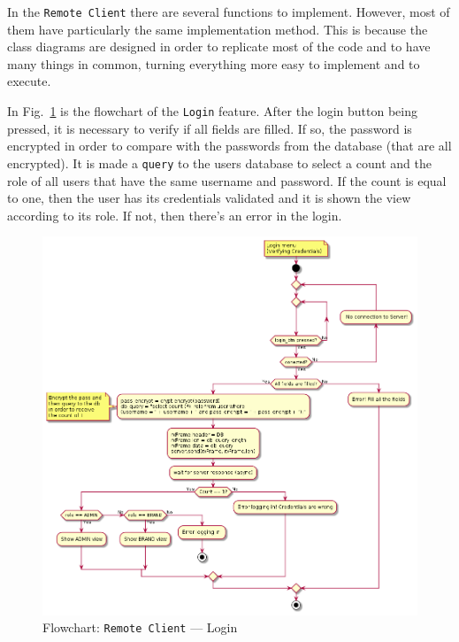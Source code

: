 In the \texttt{Remote Client} there are several functions to implement.
However, most of them have particularly the same implementation method.
This is because the class diagrams are designed in order to replicate most of the code and to have many things in common, turning everything more easy to implement and to execute.

In Fig.~\ref{fig:flow-rc-login} is the flowchart of the \texttt{Login} feature.
After the login button being pressed, it is necessary to verify if all fields are filled. If so, the password is encrypted in order to compare with the passwords from the database (that are all encrypted).
It is made a \texttt{query} to the users database to select a count and the role of all users that have the same username and password.
If the count is equal to one, then the user has its credentials validated and it is shown the view according to its role. If not, then there's an error in the login.
%
\begin{figure}[htb!]
\centering
    \includegraphics[width=0.8\columnwidth]{./img/flow-rc-login.png}
  \caption{Flowchart: \texttt{Remote Client} --- Login}%
\label{fig:flow-rc-login}
\end{figure}

